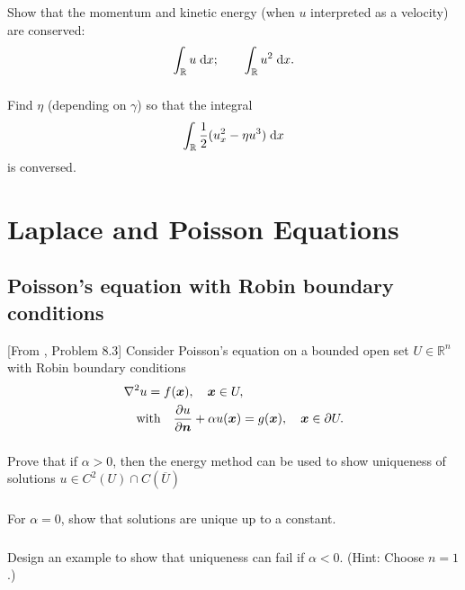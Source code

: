 \documentclass[11pt,letterpaper]{report}
\begin{document}
\subsection{}
Show that the momentum and kinetic energy (when $u$ interpreted as a velocity) are conserved:
\begin{align}
    \int_\mathbb{R} u\;\mathrm{d} x; \qquad \int_\mathbb{R} u^2\;\mathrm{d} x.
\end{align}

\subsection{}
Find $\eta$ (depending on $\gamma$) so that the integral
\begin{align}
    \int_\mathbb{R} \frac{1}{2}(u_x^2-\eta u^3)\;\mathrm{d} x
\end{align}
is conversed. 

\chapter{Laplace and Poisson Equations}
\section{Poisson’s equation with Robin boundary conditions}
[From \cite{ShearerLevy_15}, Problem 8.3]
Consider Poisson’s equation on a bounded open set $U \in\mathbb{R}^n$ with Robin boundary conditions
\begin{align}
    &\nabla^2 u = f(\boldsymbol{x}),\quad\boldsymbol{x}\in U,\\
    &\quad \mbox{with} \quad \frac{\partial u}{\partial\boldsymbol{n}}+\alpha u(\boldsymbol{x}) = g(\boldsymbol{x}),\quad\boldsymbol{x}\in\partial U.
\end{align}

\subsection{}
Prove that if $\alpha > 0$, then the energy method can be used to show
uniqueness of solutions $u\in C^2(U)\cap C(\overline{U})$

\subsection{}
For $\alpha = 0$, show that solutions are unique up to a constant.

\subsection{}
Design an example to show that uniqueness can fail if $\alpha < 0$. (Hint: Choose $n = 1$.)
\end{document}
